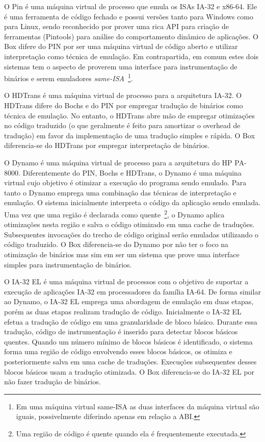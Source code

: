 \documentclass[11pt,twoside]{article}
\begin{document}
O Pin \cite{Luk2005} é uma máquina virtual de processo que emula os ISAs IA-32 e 
x86-64. Ele é uma ferramenta de código fechado e possui versões tanto para Windows 
como para Linux, sendo reconhecido por prover uma rica API para criação de 
ferramentas (Pintools) para análise do comportamento dinâmico de aplicações. O Box 
difere do PIN por ser uma máquina virtual de código aberto e utilizar interpretação 
como técnica de emulação. Em contrapartida, em comum estes dois sistemas tem o 
aspecto de proverem uma interface para instrumentação de binários e serem emuladores 
\emph{same-ISA}~\footnote{Em uma máquina virtual same-ISA as duas interfaces da 
máquina virtual são iguais, possivelmente diferindo apenas em relação a ABI.}.

O HDTrans \cite{Sridhar2006} é uma máquina virtual de processo para a arquitetura 
IA-32. O HDTrans difere do Bochs e do PIN por empregar tradução de binários como 
técnica de emulação. No entanto, o HDTrans abre mão de empregar otimizações no 
código traduzido (o que geralmente é feito para amortizar o overhead de tradução) 
em favor da implementação de uma tradução simples e rápida. O Box diferencia-se do 
HDTrans por empregar interpretação de binários.

O Dynamo \cite{Bala2000} é uma máquina virtual de processo para a arquitetura do 
HP PA-8000. Diferentemente do PIN, Bochs e HDTrans, o Dynamo é uma máquina virtual 
cujo objetivo é otimizar a execução do programa sendo emulado. Para tanto o Dynamo 
emprega uma combinação das técnicas de interpretação e emulação. O sistema 
inicialmente interpreta o código da aplicação sendo emulada. Uma vez que uma região 
é declarada como quente~\footnote{Uma região de código é quente quando ela é 
frequentemente executada.}, o Dynamo aplica otimizações nesta região e salva o 
código otimizado em uma cache de traduções. Subsequentes invocações do trecho de 
código original serão emuladas utilizando o código traduzido. O Box diferencia-se 
do Dynamo por não ter o foco na otimização de binários mas sim em ser um sistema 
que prove uma interface simples para instrumentação de binários.

O IA-32 EL \cite{Baraz2003} é uma máquina virtual de processos com o objetivo de 
suportar a execução de aplicações IA-32 em processadores da família IA-64. De forma 
similar ao Dynamo, o IA-32 EL emprega uma abordagem de emulação em duas etapas, 
porém as duas etapas realizam tradução de código. Inicialmente o IA-32 EL efetua a 
tradução de código em uma granularidade de bloco básico. Durante essa tradução, 
código de instrumentação é inserido para detectar blocos básicos quentes. Quando um 
número mínimo de blocos básicos é identificado, o sistema forma uma região de código 
envolvendo esses blocos básicos, os otimiza e posteriormente salva em uma cache de 
traduções. Execuções subsequentes desses blocos básicos usam a tradução otimizada. 
O Box diferencia-se do IA-32 EL por não fazer tradução de binários.
\end{document}
